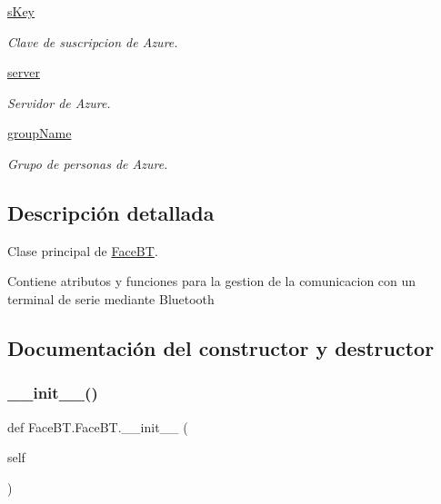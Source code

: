 \begin{DoxyCompactItemize}
\mbox{\hyperlink{class_face_b_t_1_1_face_b_t_aa7cfb934d57a9f7b21d05ff5cedb95a1}{s\+Key}}
\begin{DoxyCompactList}\small\item\em Clave de suscripcion de Azure. \end{DoxyCompactList}\item 
\mbox{\hyperlink{class_face_b_t_1_1_face_b_t_af768b1f81785e8008c14dca18114a0d6}{server}}
\begin{DoxyCompactList}\small\item\em Servidor de Azure. \end{DoxyCompactList}\item 
\mbox{\hyperlink{class_face_b_t_1_1_face_b_t_a94215284ec2e86d0f419830e92161d2d}{group\+Name}}
\begin{DoxyCompactList}\small\item\em Grupo de personas de Azure. \end{DoxyCompactList}\end{DoxyCompactItemize}


\subsection{Descripción detallada}
Clase principal de \mbox{\hyperlink{class_face_b_t_1_1_face_b_t}{Face\+BT}}. 

Contiene atributos y funciones para la gestion de la comunicacion con un terminal de serie mediante Bluetooth 

\subsection{Documentación del constructor y destructor}
\mbox{\label{class_face_b_t_1_1_face_b_t_a577945ffe52fd053fabb2cf47b55dad2}} 
\subsubsection{\texorpdfstring{\+\_\+\+\_\+init\+\_\+\+\_\+()}{\_\_init\_\_()}}
{\footnotesize\ttfamily def Face\+B\+T.\+Face\+B\+T.\+\_\+\+\_\+init\+\_\+\+\_\+ (\begin{DoxyParamCaption}\item[{}]{self }\end{DoxyParamCaption})}




